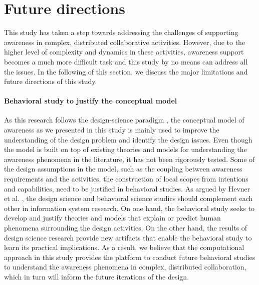 \section{Future directions} %
\label{sec:future_directions}
This study has taken a step towards addressing the challenges of supporting awareness in complex, distributed collaborative activities. However, due to the higher level of complexity and dynamics in these activities, awareness support becomes a much more difficult task and this study by no means can address all the issues. In the following of this section, we discuss the major limitations and future directions of this study. 

\paragraph*{Behavioral study to justify the conceptual model} %
\label{par:behavioral_study_to_understand_the_conceptual_model}
As this research follows the design-science paradigm \cite{Hevner2004}, the conceptual model of awareness as we presented in this study is mainly used to improve the understanding of the design problem and identify the design issues. Even though the model is built on top of existing theories and models for understanding the awareness phenomena in the literature, it has not been rigorously tested. Some of the design assumptions in the model, such as the coupling between awareness requirements and the activities, the construction of local scopes from intentions and capabilities, need to be justified in behavioral studies. As argued by Hevner et al. \cite{Hevner2004}, the design science and behavioral science studies should complement each other in information system research. On one hand, the behavioral study seeks to develop and justify theories and models that explain or predict human phenomena surrounding the design activities. On the other hand, the results of design science research provide new artifacts that enable the behavioral study to learn its practical implications. As a result, we believe that the computational approach in this study provides the platform to conduct future behavioral studies to understand the awareness phenomena in complex, distributed collaboration, which in turn will inform the future iterations of the design. 

